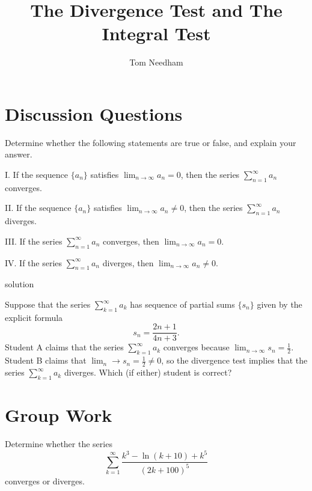 \documentclass[handout]{ximera}
\author{Tom Needham}
\title[]{The Divergence Test and The Integral Test}
\begin{document}
\begin{abstract}
\end{abstract}
\maketitle

\vspace{-0.9in}

\section{Discussion Questions}

\begin{problem}
Determine whether the following statements are true or false, and explain your answer.

I. If the sequence $\{a_n\}$ satisfies $\lim_{n\rightarrow \infty} a_n = 0$, then the series $\sum_{n=1}^\infty a_n$ converges.

II. If the sequence $\{a_n\}$ satisfies $\lim_{n \rightarrow \infty} a_n \neq 0$, then the series $\sum_{n=1}^\infty a_n$ diverges.

III. If the series $\sum_{n=1}^\infty a_n$ converges, then $\lim_{n\rightarrow \infty} a_n = 0$. 

IV. If the series $\sum_{n=1}^\infty a_n$ diverges, then $\lim_{n\rightarrow \infty} a_n \neq 0$. 

\end{problem}

\begin{freeResponse}
solution
\end{freeResponse}

\begin{problem}
Suppose that the series $\sum_{k=1}^\infty a_k$ has sequence of partial sums $\{s_n\}$ given by the explicit formula
$$
s_n = \frac{2n+1}{4n+3}.
$$
Student A claims that the series $\sum_{k=1}^\infty a_k$ converges because $\lim_{n \rightarrow \infty} s_n = \frac{1}{2}$. Student B claims that $\lim_n\rightarrow s_n = \frac{1}{2} \neq 0$, so the divergence test implies that the series $\sum_{k=1}^\infty a_k$ diverges. Which (if either) student is correct?
\end{problem}

\section{Group Work}

\begin{problem}
Determine whether the series
$$
\sum_{k=1}^\infty \frac{k^3 - \ln(k+10) + k^5}{(2k+100)^5}
$$
converges or diverges.
\end{problem}
\end{document}

